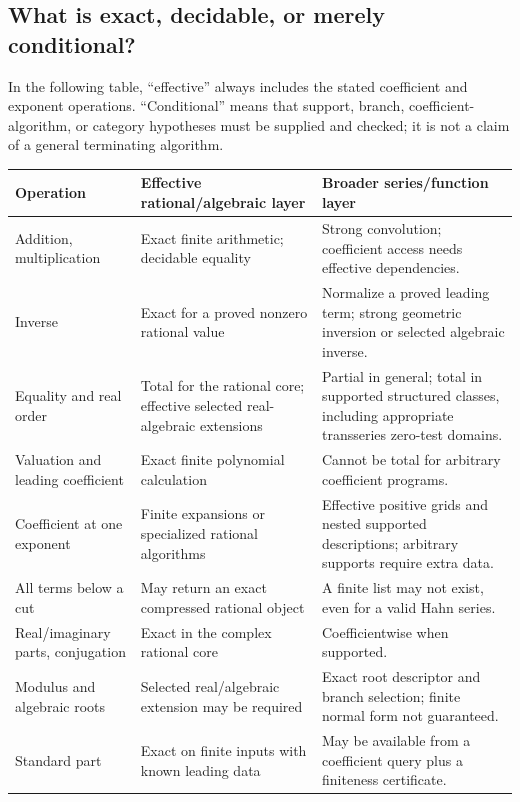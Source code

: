 \documentclass[11pt,letterpaper]{article}
\theoremstyle{definition}\newtheorem{definition}[theorem]{Definition}
\theoremstyle{remark}\newtheorem{remark}[theorem]{Remark}
\numberwithin{equation}{section}\setcounter{tocdepth}{2}
\begin{document}
\subsection{What is exact, decidable, or merely conditional?}
In the following table, ``effective'' always includes the stated coefficient and exponent operations. ``Conditional'' means that support, branch, coefficient-algorithm, or category hypotheses must be supplied and checked; it is not a claim of a general terminating algorithm.
\begin{center}\small
\begin{longtable}{@{}L{0.27\textwidth}L{0.31\textwidth}L{0.33\textwidth}@{}}
\toprule Operation & Effective rational/algebraic layer & Broader series/function layer\\\midrule\endhead
Addition, multiplication & Exact finite arithmetic; decidable equality & Strong convolution; coefficient access needs effective dependencies.\\[0.4em]
Inverse & Exact for a proved nonzero rational value & Normalize a proved leading term; strong geometric inversion or selected algebraic inverse.\\[0.4em]
Equality and real order & Total for the rational core; effective selected real-algebraic extensions & Partial in general; total in supported structured classes, including appropriate transseries zero-test domains.\\[0.4em]
Valuation and leading coefficient & Exact finite polynomial calculation & Cannot be total for arbitrary coefficient programs.\\[0.4em]
Coefficient at one exponent & Finite expansions or specialized rational algorithms & Effective positive grids and nested supported descriptions; arbitrary supports require extra data.\\[0.4em]
All terms below a cut & May return an exact compressed rational object & A finite list may not exist, even for a valid Hahn series.\\[0.4em]
Real/imaginary parts, conjugation & Exact in the complex rational core & Coefficientwise when supported.\\[0.4em]
Modulus and algebraic roots & Selected real/algebraic extension may be required & Exact root descriptor and branch selection; finite normal form not guaranteed.\\[0.4em]
Standard part & Exact on finite inputs with known leading data & May be available from a coefficient query plus a finiteness certificate.\\[0.4em]

\end{longtable}
\end{center}
\end{document}
